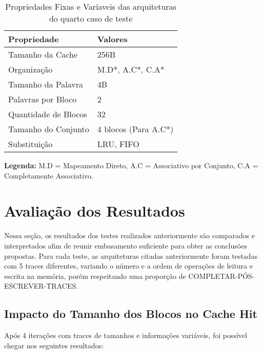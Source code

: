 \documentclass[conference]{IEEEtran}
\begin{document}
\begin{table}[htb]
\centering
\begin{tabular}{|l|l|}
\hline
\textbf{Propriedade}       & \textbf{Valores}         \\ \hline
Tamanho da Cache           & 256B                    \\ \hline
Organização                & M.D*, A.C*, C.A*        \\ \hline
Tamanho da Palavra         & 4B                  \\ \hline
Palavras por Bloco         & 2                \\ \hline
Quantidade de Blocos       & 32         \\ \hline
Tamanho do Conjunto        & 4 blocos (Para A.C*)    \\ \hline
Substituição               & LRU, FIFO \\ \hline
\end{tabular}
\caption{Propriedades Fixas e Varíaveis das arquiteturas do quarto caso de teste}
\label{tab:propriedades}
\vspace{0.5cm}
\footnotesize
\textbf{Legenda:} M.D = Mapeamento Direto, A.C = Associativo por Conjunto, C.A = Completamente Associativo.
\end{table}

\section{Avaliação dos Resultados}
Nessa seção, os resultados dos testes realizados anteriormente são comparados e interpretados afim de reunir embasamento suficiente para obter as conclusões propostas. Para cada teste, as arquiteturas citadas anteriormente foram testadas com 5 traces diferentes, variando o número e a ordem de operações de leitura e escrita na memória, porém respeitando uma proporção de COMPLETAR-PÓS-ESCREVER-TRACES.

\subsection{Impacto do Tamanho dos Blocos no Cache Hit}
Após 4 iterações com traces de tamanhos e informações variáveis, foi possível chegar nos seguintes resultados:
\end{document}
